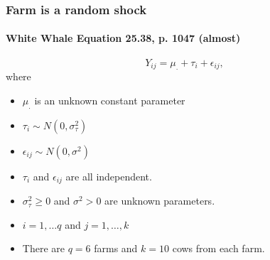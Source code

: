 \documentclass[serif]{beamer} %
\begin{document}
\begin{frame}
\frametitle{Farm is a random shock}
\framesubtitle{White Whale Equation 25.38, p. 1047 (almost)} 
{\LARGE
\begin{displaymath}
    Y_{ij} = \mu_. + \tau_i + \epsilon_{ij},
\end{displaymath} }
where
  \begin{itemize}
    \item[] $\mu_.$ is an unknown constant parameter
    \item[] $\tau_i \sim N(0,\sigma^2_\tau)$
    \item[] $\epsilon_{ij} \sim N(0,\sigma^2)$
    \item[] $\tau_i$ and $\epsilon_{ij}$ are all independent.
    \item[] $\sigma^2_\tau \geq 0$ and $\sigma^2 > 0$ are unknown parameters.
    \item[] $i=1, \ldots q$ and $j=1, \ldots, k$ 
    \item[] There are $q=6$ farms and $k=10$ cows from each farm.
  \end{itemize}
\end{frame}
\end{document}
